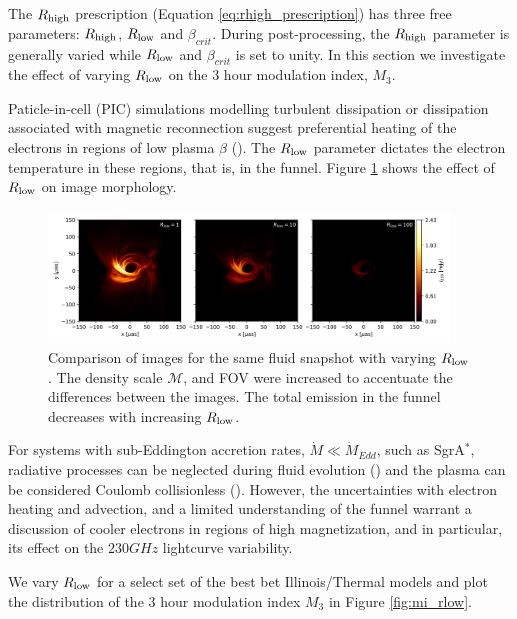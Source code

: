 The $R_\mathrm{high}$ prescription (Equation \ref{eq:rhigh_prescription}) has three free parameters: $R_\mathrm{high}$, $R_\mathrm{low}$ and $\beta_{crit}$. During post-processing, the $R_\mathrm{high}$ parameter is generally varied while $R_\mathrm{low}$ and $\beta_{crit}$ is set to unity. In this section we investigate the effect of varying $R_\mathrm{low}$ on the 3 hour modulation index, $M_{3}$.

Paticle-in-cell (PIC) simulations modelling turbulent dissipation or dissipation associated with magnetic reconnection suggest preferential heating of the electrons in regions of low plasma $\beta$ (\citealt{2010MNRAS.409L.104H, Rowan_2017, 10.1093/mnras/stx2530, Rowan_2019, Kawazura771, PhysRevX.10.041050, kawazura2021energy}). The $R_\mathrm{low}$ parameter dictates the electron temperature in these regions, that is, in the funnel. Figure \ref{fig:rlow_comparison} shows the effect of $R_\mathrm{low}$ on image morphology.

\begin{figure}
\centering
\includegraphics[width=0.95\textwidth]{figures/rlow_comparison_rhigh160.png}
\caption{Comparison of images for the same fluid snapshot with varying $R_\mathrm{low}$. The density scale $\mathcal{M}$, and FOV were increased to accentuate the differences between the images. The total emission in the funnel decreases with increasing $R_\mathrm{low}$.}
\label{fig:rlow_comparison}
\end{figure}

For systems with sub-Eddington accretion rates, $\Dot{M}\ll\Dot{M}_{Edd}$, such as SgrA$^{*}$, radiative processes can be neglected during fluid evolution (\citealt{2012MNRAS.426.1928D, 10.1093/mnras/stw3116, Ryan_2017}) and the plasma can be considered Coulomb collisionless (\citealt{Mahadevan_1997, 10.1093/mnras/stw3116, Ryan_2017}). However, the uncertainties with electron heating and advection, and a limited understanding of the funnel warrant a discussion of cooler electrons in regions of high magnetization, and in particular, its effect on the $230GHz$ lightcurve variability. 

We vary $R_\mathrm{low}$ for a select set of the best bet Illinois/Thermal models and plot the distribution of the 3 hour modulation index $M_{3}$ in Figure \ref{fig:mi_rlow}.

